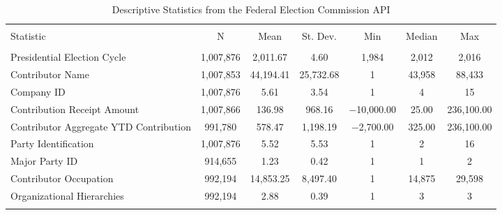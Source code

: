 
\begin{table}[!htbp] \centering 
  \caption{Descriptive Statistics from the Federal Election Commission API} 
  \label{} 
\scriptsize 
\begin{tabular}{@{\extracolsep{5pt}}lcccccc} 
\\[-1.8ex]\hline 
\hline \\[-1.8ex] 
Statistic & \multicolumn{1}{c}{N} & \multicolumn{1}{c}{Mean} & \multicolumn{1}{c}{St. Dev.} & \multicolumn{1}{c}{Min} & \multicolumn{1}{c}{Median} & \multicolumn{1}{c}{Max} \\ 
\hline \\[-1.8ex] 
Presidential Election Cycle & 1,007,876 & 2,011.67 & 4.60 & 1,984 & 2,012 & 2,016 \\ 
Contributor Name & 1,007,853 & 44,194.41 & 25,732.68 & 1 & 43,958 & 88,433 \\ 
Company ID & 1,007,876 & 5.61 & 3.54 & 1 & 4 & 15 \\ 
Contribution Receipt Amount & 1,007,866 & 136.98 & 968.16 & $-$10,000.00 & 25.00 & 236,100.00 \\ 
Contributor Aggregate YTD Contribution & 991,780 & 578.47 & 1,198.19 & $-$2,700.00 & 325.00 & 236,100.00 \\ 
Party Identification & 1,007,876 & 5.52 & 5.53 & 1 & 2 & 16 \\ 
Major Party ID & 914,655 & 1.23 & 0.42 & 1 & 1 & 2 \\ 
Contributor Occupation & 992,194 & 14,853.25 & 8,497.40 & 1 & 14,875 & 29,598 \\ 
Organizational Hierarchies & 992,194 & 2.88 & 0.39 & 1 & 3 & 3 \\ 
\hline \\[-1.8ex] 
\end{tabular} 
\end{table}  
